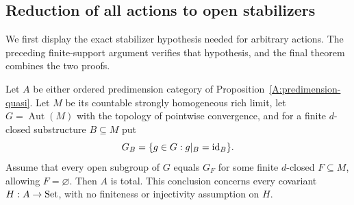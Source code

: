 \subsection{Reduction of all actions to open stabilizers}

We first display the exact stabilizer hypothesis needed for arbitrary
actions. The preceding finite-support argument verifies that hypothesis,
and the final theorem combines the two proofs.

\begin{proposition}
\label{A:predimension-stabilizer-criterion}
Let $A$ be either ordered predimension category of
Proposition~\ref{A:predimension-quasi}. Let $M$ be its countable
strongly homogeneous rich limit, let $G=\operatorname{Aut}(M)$ with
the topology of pointwise convergence, and for a finite $d$-closed
substructure $B\subseteq M$ put
\[
 G_B=\{g\in G:g|_B=\mathrm{id}_B\}.
\]
Assume that every open subgroup of $G$ equals $G_F$ for some finite
$d$-closed $F\subseteq M$, allowing $F=\varnothing$.
Then $A$ is total. This conclusion concerns every covariant
$H:A\to\mathrm{Set}$, with no finiteness or injectivity assumption on $H$.
\end{proposition}

